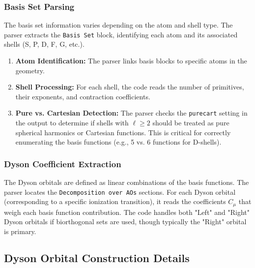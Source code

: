 \documentclass{article}
\begin{document}
\subsubsection{Basis Set Parsing}
The basis set information varies depending on the atom and shell type. The parser extracts the \texttt{Basis Set} block, identifying each atom and its associated shells (S, P, D, F, G, etc.).
\begin{enumerate}
    \item \textbf{Atom Identification:} The parser links basis blocks to specific atoms in the geometry.
    \item \textbf{Shell Processing:} For each shell, the code reads the number of primitives, their exponents, and contraction coefficients.
    \item \textbf{Pure vs. Cartesian Detection:} The parser checks the \texttt{purecart} setting in the output to determine if shells with $\ell \ge 2$ should be treated as pure spherical harmonics or Cartesian functions. This is critical for correctly enumerating the basis functions (e.g., 5 vs. 6 functions for D-shells).
\end{enumerate}

\subsubsection{Dyson Coefficient Extraction}
The Dyson orbitals are defined as linear combinations of the basis functions. The parser locates the \texttt{Decomposition over AOs} sections. For each Dyson orbital (corresponding to a specific ionization transition), it reads the coefficients $C_\mu$ that weigh each basis function contribution. The code handles both "Left" and "Right" Dyson orbitals if biorthogonal sets are used, though typically the "Right" orbital is primary.

\subsection{Dyson Orbital Construction Details}
\end{document}
